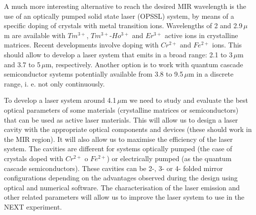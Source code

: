A much more interesting alternative to reach the desired MIR wavelength is the use of an optically pumped solid state laser (OPSSL) system, by means of a specific doping of crystals with metal transition ions. Wavelengths of 2 and 2.9\,$\mu$m are available with $Tm^{3+}$, $Tm^{3+}$-$Ho^{3+}$ and $Er^{3+}$ active ions in crystalline matrices. Recent developments involve doping with $Cr^{2+}$ and $Fe^{2+}$ ions. This should allow to develop a laser system that emits in a broad range: 2.1 to 3\,$\mu$m and 3.7 to 5\,$\mu$m, respectively. Another option is to work with quantum cascade semiconductor systems potentially available from 3.8 to 9.5\,$\mu$m in a discrete range, i. e.  not only continuously. 

To develop a laser system around 4.1\,$\mu$m we need to study and evaluate the best optical parameters of some materials (crystalline matrices or semiconductors) that can be used as active laser materials.  This will allow us to design a laser cavity with the appropriate  optical components and devices (these should work in the MIR region). It will also allow us to maximise the efficiency of the laser system. The cavities are different for systems optically pumped (the case of crystals doped with $Cr^{2+}$ o $Fe^{2+}$) or electrically pumped (as the quantum cascade semiconductors). These cavities can be 2-, 3- or 4- folded mirror configurations depending on the advantages observed during the design using optical and numerical software. The characterisation of the laser emission and other related parameters will allow us  to improve the laser system to use in the NEXT experiment. 